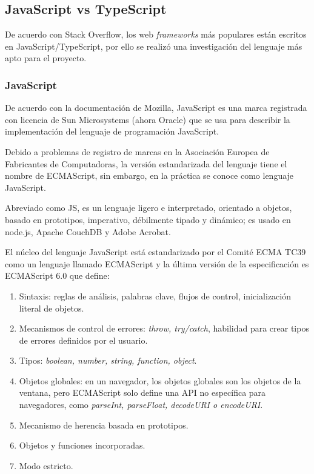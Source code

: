 \subsection{JavaScript vs TypeScript}\label{ref:sec-javascript}

De acuerdo con Stack Overflow\cite{noauthor_most_nodate}, los web \textit{frameworks} más populares están escritos en JavaScript/TypeScript, por ello se realizó una investigación del lenguaje más apto para el proyecto.

\subsubsection*{JavaScript}
De acuerdo con la documentación de Mozilla\cite{noauthor_javascript_nodate}, JavaScript es una marca registrada con licencia de Sun Microsystems (ahora Oracle) que se usa para describir la implementación del lenguaje de programación JavaScript.


Debido a problemas de registro de marcas en la Asociación Europea de Fabricantes de Computadoras, la versión estandarizada del lenguaje tiene el nombre de ECMAScript, sin embargo, en la práctica se conoce como lenguaje JavaScript. 


Abreviado como JS, es un lenguaje ligero e interpretado, orientado a objetos, basado en prototipos, imperativo, débilmente tipado y dinámico; es usado en node.js, Apache CouchDB y Adobe Acrobat.


El núcleo del lenguaje JavaScript está estandarizado por el Comité ECMA TC39 como un lenguaje llamado ECMAScript y la última versión de la especificación es ECMAScript 6.0 que define: 

\begin{enumerate}
    \item Sintaxis: reglas de análisis, palabras clave, flujos de control, inicialización literal de objetos.
    \item Mecanismos de control de errores: \textit{throw, try/catch}, habilidad para crear tipos de errores definidos por el usuario.
    \item Tipos: \textit{boolean, number, string, function, object}.
    \item  Objetos globales: en un navegador, los objetos globales son los objetos de la ventana, pero ECMAScript solo define una API no específica para navegadores, como \textit{parseInt, parseFloat, decodeURI o encodeURI}.
    \item Mecanismo de herencia basada en prototipos.
    \item Objetos y funciones incorporadas.
    \item Modo estricto.
\end{enumerate}

